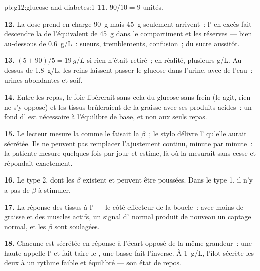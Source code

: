 \begin{solution}{pb:g12:glucose-and-diabetes:1}
\textbf{11.} $90/10 = 9$ unités.

\textbf{12.} La dose prend en charge \qty{90}{g} mais \qty{45}{g}
seulement arrivent~: l' en excès fait descendre la  de
l'équivalent de \qty{45}{g} dans le compartiment et les
réserves --- bien au-dessous de \qty{0.6}{g/L}~: sueurs, tremblements,
confusion~; du sucre aussitôt.

\textbf{13.} $(5 + 90)/5 = \qty{19}{g/L}$ si rien n'était retiré~; en
réalité, plusieurs \unit{g/L}. Au-dessus de \qty{1.8}{g/L}, les reins
laissent passer le glucose dans l'urine, avec de l'eau~: urines
abondantes et soif.

\textbf{14.} Entre les repas, le foie libérerait sans cela du glucose
sans frein (le  agit, rien ne s'y oppose) et les tissus
brûleraient de la graisse avec ses produits acides~: un fond
d' est nécessaire à l'équilibre de base, et non aux seuls
repas.

\textbf{15.} Le lecteur mesure la  comme le faisait la 
$\beta$~; le stylo délivre l' qu'elle aurait sécrétée. Ils ne
peuvent pas remplacer l'ajustement continu, minute par minute~: la
patiente mesure quelques fois par jour et estime, là où la 
mesurait sans cesse et répondait exactement.

\textbf{16.} Le type 2, dont les  $\beta$ existent et peuvent
être poussées. Dans le type 1, il n'y a pas de  $\beta$ à
stimuler.

\textbf{17.} La réponse des tissus à l' --- le côté effecteur
de la boucle~: avec moins de graisse et des muscles actifs, un signal
d' normal produit de nouveau un captage normal, et les
 $\beta$ sont soulagées.

\textbf{18.} Chacune est sécrétée en réponse à l'écart opposé de la
même grandeur~: une  haute appelle l' et fait taire le
, une  basse fait l'inverse. À \qty{1}{g/L}, l'îlot
sécrète les deux à un rythme faible et équilibré --- son état de
repos.


\end{solution}
